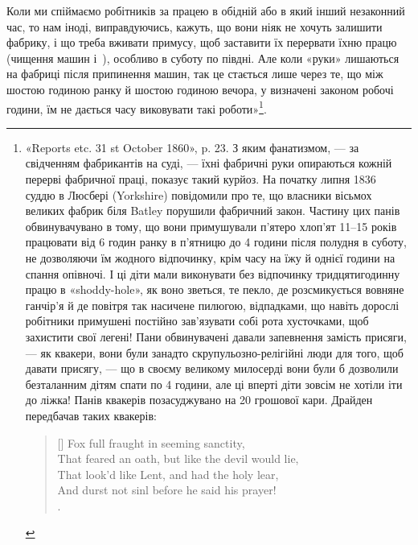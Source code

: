 Коли ми спіймаємо робітників за працею в обідній або в який
інший незаконний час, то нам іноді, виправдуючись, кажуть,
що вони ніяк не хочуть залишити фабрику, і що треба вживати
примусу, щоб заставити їх перервати їхню працю (чищення машин
і~), особливо в суботу по півдні. Але коли «руки» лишаються
на фабриці після припинення машин, так це стається лише
через те, що між шостою годиною ранку й шостою годиною вечора,
у визначені законом робочі години, їм не дається часу виковувати
такі роботи»\footnote{
«Reports etc. 31 st October 1860», p. 23. З яким фанатизмом, — за
свідченням фабрикантів на суді, — їхні фабричні руки опираються кожній
перерві фабричної праці, показує такий курйоз. На початку липня 1836~
суддю в Люсбері (Yorkshire) повідомили про те, що власники вісьмох великих
фабрик біля Batley порушили фабричний закон. Частину цих панів
обвинувачувано в тому, що вони примушували п’ятеро хлоп’ят 11--15 років
працювати від 6 годин ранку в п’ятницю до 4 години після полудня
в суботу, не дозволяючи їм жодного відпочинку, крім часу на їжу й однієї
години на спання опівночі. І ці діти мали виконувати без відпочинку тридцятигодинну
працю в «shoddy-hole», як воно зветься, те пекло, де розсмикується
вовняне ганчір’я й де повітря так насичене пилюгою, відпадками,
що навіть дорослі робітники примушені постійно зав’язувати собі рота
хусточками, щоб захистити свої легені! Пани обвинувачені давали запевнення
замість присяги, — як квакери, вони були занадто скрупульозно-релігійні
люди для того, щоб давати присягу, — що в своєму великому
милосерді вони були б дозволили безталанним дітям спати по 4 години,
але ці вперті діти зовсім не хотіли іти до ліжка! Панів квакерів
позасуджувано на 20 грошової кари. Драйден передбачав
таких квакерів:
\settowidth{\versewidth}{That feared an oath, but like the devil would lie,}
\begin{verse}[\versewidth]
Fox full fraught in seeming sanctity,\\
That feared an oath, but like the devil would lie,\\
That look’d like Lent, and had the holy lear,\\
And durst not sinl before he said his prayer! \\
.\\
\end{verse}
}.

